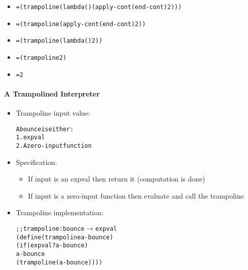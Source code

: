 \documentclass{beamer}
\newcommand{\arrow}{\(\rightarrow\)}
\begin{document}
\begin{frame}[fragile]
\begin{tiny}
\begin{itemize}
\item<10->
\begin{alltt}
= (trampoline (lambda () (apply-cont (end-cont) 2)))
\end{alltt}

\item<11->
\begin{alltt}
= (trampoline (apply-cont (end-cont) 2))
\end{alltt}

\item<12->
\begin{alltt}
= (trampoline (lambda () 2))
\end{alltt}

\item<13->
\begin{alltt}
= (trampoline 2)
\end{alltt}

\item<14->
\begin{alltt}
= 2
\end{alltt}

\end{itemize}
\end{tiny}
\end{frame}

\begin{frame}[fragile]
\framesubtitle{A Trampolined Interpreter}
\begin{scriptsize}
\begin{itemize}
\item<1-> Trampoline input value:
\begin{alltt}
A bounce is either:
  1. expval 
  2. A zero-input function
\end{alltt}

\item<2-> Specification:
\begin{itemize}
\item If input is an expval then return it (computation is done)
\item If input is a zero-input function then evaluate and call the trampoline
\end{itemize}

\item<3-> Trampoline implementation:
\begin{alltt}
;; trampoline : bounce \arrow{} expval
(define (trampoline a-bounce)
    (if (expval? a-bounce)
        a-bounce
        (trampoline (a-bounce))))
\end{alltt}

\end{itemize}
\end{scriptsize}
\end{frame}
\end{document}
